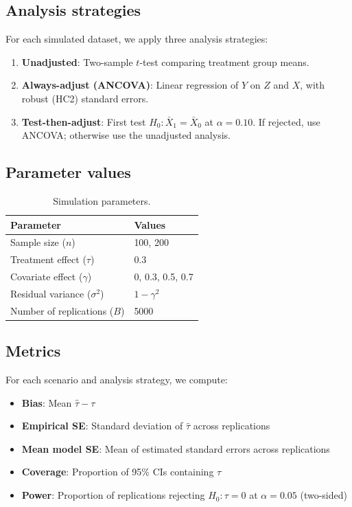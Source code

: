 \documentclass[
  11pt,
]{article}
\providecommand{\tightlist}{%
  \setlength{\itemsep}{0pt}\setlength{\parskip}{0pt}}
\begin{document}
\subsection{Analysis strategies}\label{analysis-strategies}

For each simulated dataset, we apply three analysis
strategies:

\begin{enumerate}
\def\labelenumi{\arabic{enumi}.}
\tightlist
\item
  \textbf{Unadjusted}: Two-sample \(t\)-test comparing
  treatment group means.
\item
  \textbf{Always-adjust (ANCOVA)}: Linear regression of
  \(Y\) on \(Z\) and \(X\), with robust (HC2) standard
  errors.
\item
  \textbf{Test-then-adjust}: First test \(H_0: \bar{X}_1 =
  \bar{X}_0\) at \(\alpha = 0.10\). If rejected, use
  ANCOVA; otherwise use the unadjusted analysis.
\end{enumerate}

\subsection{Parameter values}\label{parameter-values}

\begin{table}[!h]
\centering
\caption{\label{tab:params}Simulation parameters.}
\centering
\fontsize{10}{12}\selectfont
\begin{tabular}[t]{ll}
\toprule
Parameter & Values\\
\midrule
Sample size ($n$) & 100, 200\\
Treatment effect ($\tau$) & 0.3\\
Covariate effect ($\gamma$) & 0, 0.3, 0.5, 0.7\\
Residual variance ($\sigma^2$) & $1 - \gamma^2$\\
Number of replications ($B$) & 5000\\
\bottomrule
\end{tabular}
\end{table}

\subsection{Metrics}\label{metrics}

For each scenario and analysis strategy, we compute:

\begin{itemize}
\tightlist
\item
  \textbf{Bias}: Mean \(\hat{\tau} - \tau\)
\item
  \textbf{Empirical SE}: Standard deviation of
  \(\hat{\tau}\) across replications
\item
  \textbf{Mean model SE}: Mean of estimated standard
  errors across replications
\item
  \textbf{Coverage}: Proportion of 95\% CIs containing
  \(\tau\)
\item
  \textbf{Power}: Proportion of replications rejecting
  \(H_0: \tau = 0\) at \(\alpha = 0.05\) (two-sided)
\end{itemize}
\end{document}

